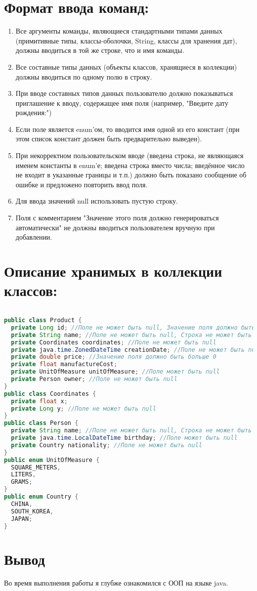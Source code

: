 \documentclass{article}
\begin{document}
\section*{Формат ввода команд:}
\begin{enumerate}
  \item Все аргументы команды, являющиеся стандартными типами данных (примитивные типы, классы-оболочки, String, классы для хранения дат), должны вводиться в той же строке, что и имя команды.
  \item Все составные типы данных (объекты классов, хранящиеся в коллекции) должны вводиться по одному полю в строку.
  \item При вводе составных типов данных пользователю должно показываться приглашение к вводу, содержащее имя поля (например, "Введите дату рождения:")
  \item Если поле является enum'ом, то вводится имя одной из его констант (при этом список констант должен быть предварительно выведен).
  \item При некорректном пользовательском вводе (введена строка, не являющаяся именем константы в enum'е; введена строка вместо числа; введённое число не входит в указанные границы и т.п.) должно быть показано сообщение об ошибке и предложено повторить ввод поля.
  \item Для ввода значений null использовать пустую строку.
  \item Поля с комментарием "Значение этого поля должно генерироваться автоматически" не должны вводиться пользователем вручную при добавлении.
\end{enumerate}

\section*{Описание хранимых в коллекции классов:}
\begin{lstlisting}[language=java]
  
public class Product {
  private Long id; //Поле не может быть null, Значение поля должно быть больше 0, Значение этого поля должно быть уникальным, Значение этого поля должно генерироваться автоматически
  private String name; //Поле не может быть null, Строка не может быть пустой
  private Coordinates coordinates; //Поле не может быть null
  private java.time.ZonedDateTime creationDate; //Поле не может быть null, Значение этого поля должно генерироваться автоматически
  private double price; //Значение поля должно быть больше 0
  private float manufactureCost;
  private UnitOfMeasure unitOfMeasure; //Поле может быть null
  private Person owner; //Поле не может быть null
}
public class Coordinates {
  private float x;
  private Long y; //Поле не может быть null
}
public class Person {
  private String name; //Поле не может быть null, Строка не может быть пустой
  private java.time.LocalDateTime birthday; //Поле может быть null
  private Country nationality; //Поле не может быть null
}
public enum UnitOfMeasure {
  SQUARE_METERS,
  LITERS,
  GRAMS;
}
public enum Country {
  CHINA,
  SOUTH_KOREA,
  JAPAN;
}
\end{lstlisting}

\section*{Вывод}
Во время выполнения работы я глубже ознакомился с ООП на языке java.
\end{document}
